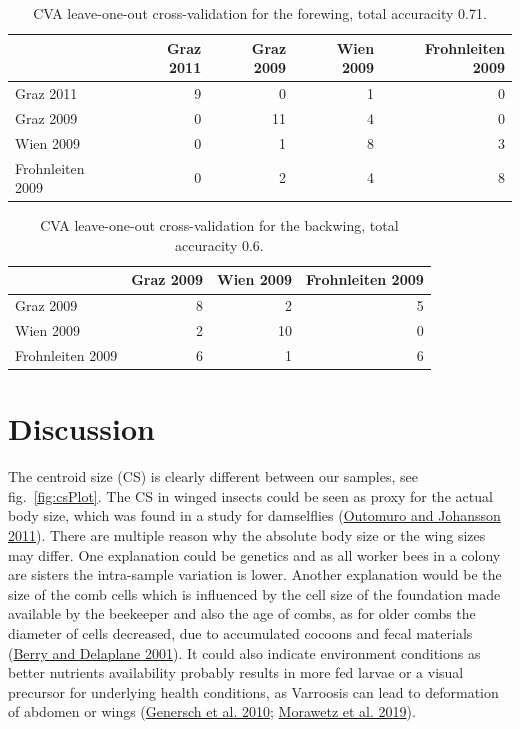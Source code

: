 \documentclass[
]{article}
\begin{document}
\begin{table}

\caption{\label{tab:fwCVA}CVA leave-one-out cross-validation for the forewing, total accuracity 0.71.}
\centering
\begin{tabular}[t]{lrrrr}
\toprule
  & Graz 2011 & Graz 2009 & Wien 2009 & Frohnleiten 2009\\
\midrule
Graz 2011 & 9 & 0 & 1 & 0\\
Graz 2009 & 0 & 11 & 4 & 0\\
Wien 2009 & 0 & 1 & 8 & 3\\
Frohnleiten 2009 & 0 & 2 & 4 & 8\\
\bottomrule
\end{tabular}
\end{table}

\begin{table}

\caption{\label{tab:bwCVA}CVA leave-one-out cross-validation for the backwing, total accuracity 0.6.}
\centering
\begin{tabular}[t]{lrrr}
\toprule
  & Graz 2009 & Wien 2009 & Frohnleiten 2009\\
\midrule
Graz 2009 & 8 & 2 & 5\\
Wien 2009 & 2 & 10 & 0\\
Frohnleiten 2009 & 6 & 1 & 6\\
\bottomrule
\end{tabular}
\end{table}

\hypertarget{discussion}{%
\section{Discussion}\label{discussion}}

The centroid size (CS) is clearly different between our samples, see fig.~\ref{fig:csPlot}. The CS in winged insects could be seen as proxy for the actual body size, which was found in a study for damselflies (\protect\hyperlink{ref-outomuro2011}{Outomuro and Johansson 2011}). There are multiple reason why the absolute body size or the wing sizes may differ. One explanation could be genetics and as all worker bees in a colony are sisters the intra-sample variation is lower. Another explanation would be the size of the comb cells which is influenced by the cell size of the foundation made available by the beekeeper and also the age of combs, as for older combs the diameter of cells decreased, due to accumulated cocoons and fecal materials (\protect\hyperlink{ref-berry2001}{Berry and Delaplane 2001}). It could also indicate environment conditions as better nutrients availability probably results in more fed larvae or a visual precursor for underlying health conditions, as Varroosis can lead to deformation of abdomen or wings (\protect\hyperlink{ref-genersch2010}{Genersch et al. 2010}; \protect\hyperlink{ref-morawetz2019}{Morawetz et al. 2019}).
\end{document}

